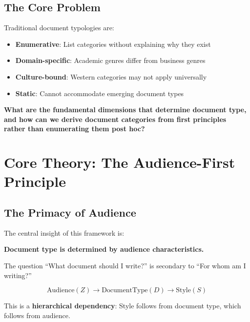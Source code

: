 \subsection{The Core Problem}

Traditional document typologies are:
\begin{itemize}[nosep]
\item \textbf{Enumerative}: List categories without explaining why they exist
\item \textbf{Domain-specific}: Academic genres differ from business genres
\item \textbf{Culture-bound}: Western categories may not apply universally
\item \textbf{Static}: Cannot accommodate emerging document types
\end{itemize}

\begin{tcolorbox}[colback=red!5!white, colframe=red!75!black,
    title=The Fundamental Question]
\textbf{What are the fundamental dimensions that determine document type,
and how can we derive document categories from first principles rather
than enumerating them post hoc?}
\end{tcolorbox}


\section{Core Theory: The Audience-First Principle}
\label{sec:doctype-theory-audience}

\subsection{The Primacy of Audience}

The central insight of this framework is:

\begin{tcolorbox}[colback=yellow!5!white, colframe=yellow!75!black,
    title=The Audience-First Principle]
\textbf{Document type is determined by audience characteristics.}

The question ``What document should I write?'' is secondary to
``For whom am I writing?''

\begin{equation}
\text{Audience}(Z) \rightarrow \text{DocumentType}(D) \rightarrow \text{Style}(S)
\end{equation}

This is a \textbf{hierarchical dependency}: Style follows from document type,
which follows from audience.
\end{tcolorbox}

